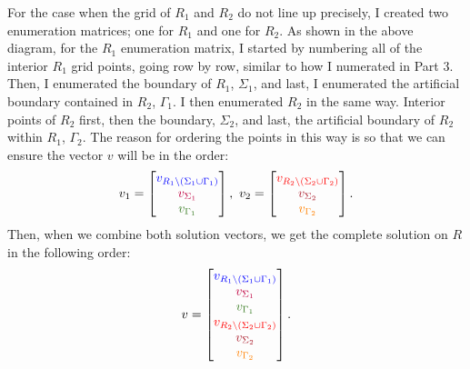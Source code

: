 \documentclass[12pt]{article}
\begin{document}
For the case when the grid of {\color{blue}$R_1$} and {\color{red}$R_2$} do not line up precisely, I created two enumeration matrices; one for {\color{blue}$R_1$} and one for {\color{red}$R_2$}.  As shown in the above diagram, for the {\color{blue}$R_1$} enumeration matrix, I started by numbering all of the interior {\color{blue}$R_1$} grid points, going row by row, similar to how I numerated in Part 3.  Then, I enumerated the boundary of {\color{blue}$R_1$}, {\color{purple}$\Sigma_1$}, and last, I enumerated the artificial boundary contained in {\color{red}$R_2$}, {\color{OliveGreen}$\Gamma_1$}.  I then enumerated {\color{red}$R_2$} in the same way.  Interior points of {\color{red}$R_2$} first, then the boundary, {\color{Maroon}$\Sigma_2$}, and last, the artificial boundary of {\color{red}$R_2$} within {\color{blue}$R_1$}, {\color{orange}$\Gamma_2$}.  The reason for ordering the points in this way is so that we can ensure the vector $v$ will be in the order:
$$v_1 = \begin{bmatrix}
{\color{blue}v_{R_1\backslash (\Sigma_1 \cup \Gamma_1)}} \\
{\color{purple}v_{\Sigma_1}} \\
{\color{OliveGreen}v_{\Gamma_1}} \\
\end{bmatrix}, \text{ } v_2 = \begin{bmatrix}
{\color{red}v_{R_2\backslash (\Sigma_2 \cup \Gamma_2)}} \\
{\color{Maroon}v_{\Sigma_2}} \\
{\color{orange}v_{\Gamma_2}} \\
\end{bmatrix}.$$
Then, when we combine both solution vectors, we get the complete solution on $R$ in the following order:
$$v = \begin{bmatrix}
{\color{blue}v_{R_1\backslash (\Sigma_1 \cup \Gamma_1)}} \\
{\color{purple}v_{\Sigma_1}} \\
{\color{OliveGreen}v_{\Gamma_1}} \\
{\color{red}v_{R_2\backslash (\Sigma_2 \cup \Gamma_2)}} \\
{\color{Maroon}v_{\Sigma_2}} \\
{\color{orange}v_{\Gamma_2}} \\
\end{bmatrix}.$$
\end{document}
